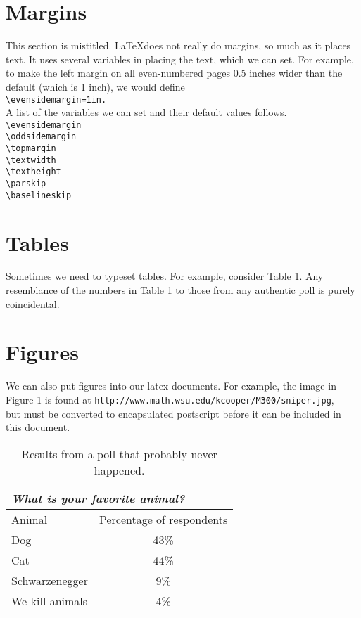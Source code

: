 \documentclass[12pt]{article}
\begin{document}
	\section{Margins}
	This section is mistitled. \LaTeX does not really do margins, so much as it
	places text. It uses several variables in placing the text, which we can set.
	For example, to make the left margin on all even-numbered pages 0.5 inches
	wider than the default (which is 1 inch), we would define\\
	\verb|\evensidemargin=1in.|\\
	\medskip
	A list of the variables we can set and their default values follows.\\
	\verb|\evensidemargin|\\
	\verb|\oddsidemargin|\\
	\verb|\topmargin|\\
	\verb|\textwidth|\\
	\verb|\textheight|\\
	\verb|\parskip|\\
	\verb|\baselineskip|
	
	\section{Tables}
	Sometimes we need to typeset tables. For example, consider Table 1. Any
	resemblance of the numbers in Table 1 to those from any authentic poll is
	purely coincidental.
	
	\section{Figures}
	We can also put figures into our latex documents. For example, the image in Figure 1 is found at \verb|http://www.math.wsu.edu/kcooper/M300/sniper.jpg|,\\ but must be converted to encapsulated postscript before it can be included in this document.
	
	\begin{table}
		\centering
		\caption{Results from a poll that probably never happened.}
		\label{a}
		\begin{tabular}{||l|c||}
			\hline
			\multicolumn{2}{||l||}{\textit{What is your favorite animal?}} \\\hline
			Animal & Percentage of respondents\\\hline
			Dog & 43\%\\
			Cat & 44\%\\
			Schwarzenegger & 9\%\\
			We kill animals & 4\%\\\hline\hline
		\end{tabular}
	\end{table}
\end{document}
